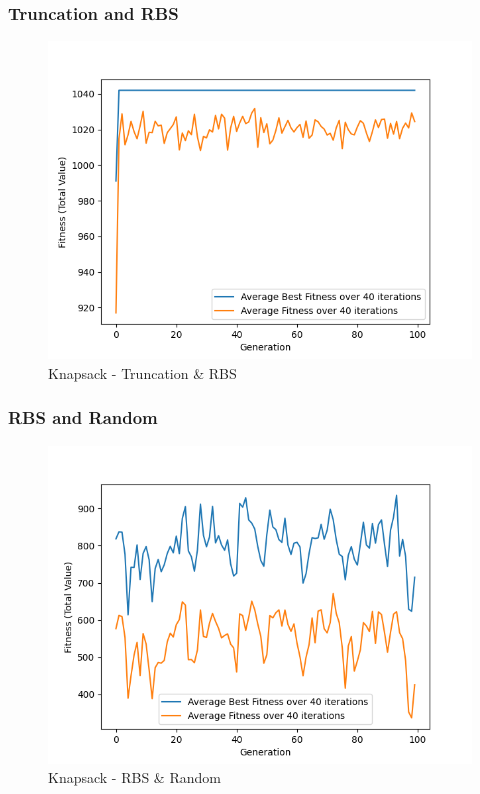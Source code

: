 \documentclass[11pt, letterpaper]{article}
\begin{document}
\subsubsection {Truncation and RBS}
\begin{figure}[H]
    \centering
    \includegraphics[scale = 0.6]{images/knapsack_tr_rb.png}
    \caption {Knapsack - Truncation \& RBS}
    \label {fig:kpTR}
\end{figure}

\subsubsection {RBS and Random}
\begin{figure}[H]
    \centering
    \includegraphics[scale = 0.6]{images/knapsack_rd_rd.png}
    \caption {Knapsack - RBS \& Random}
    \label {fig:kpRbR}
\end{figure}
\end{document}
